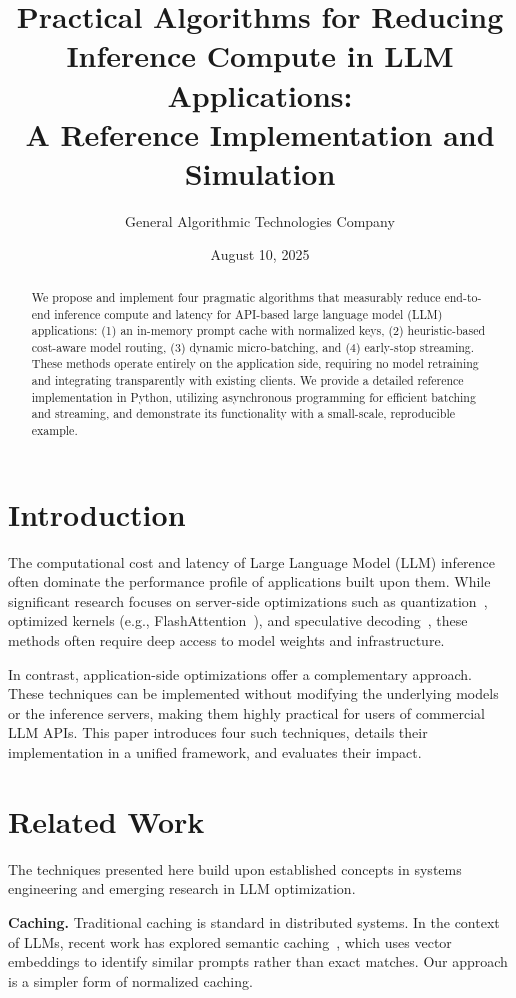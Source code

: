 \documentclass[11pt]{article}
\title{Practical Algorithms for Reducing Inference Compute in LLM Applications: \\ A Reference Implementation and Simulation}
\author{General Algorithmic Technologies Company}
\date{August 10, 2025}
\begin{document}
\maketitle

\begin{abstract}
We propose and implement four pragmatic algorithms that measurably reduce end-to-end inference compute and latency for API-based large language model (LLM) applications: (1) an in-memory prompt cache with normalized keys, (2) heuristic-based cost-aware model routing, (3) dynamic micro-batching, and (4) early-stop streaming. These methods operate entirely on the application side, requiring no model retraining and integrating transparently with existing clients. We provide a detailed reference implementation in Python, utilizing asynchronous programming for efficient batching and streaming, and demonstrate its functionality with a small-scale, reproducible example.
\end{abstract}

\section{Introduction}
The computational cost and latency of Large Language Model (LLM) inference often dominate the performance profile of applications built upon them. While significant research focuses on server-side optimizations such as quantization~\cite{frantar2022gptq}, optimized kernels (e.g., FlashAttention~\cite{dao2022flashattention}), and speculative decoding~\cite{leviathan2023fast}, these methods often require deep access to model weights and infrastructure.

In contrast, application-side optimizations offer a complementary approach. These techniques can be implemented without modifying the underlying models or the inference servers, making them highly practical for users of commercial LLM APIs. This paper introduces four such techniques, details their implementation in a unified framework, and evaluates their impact.

\section{Related Work}
The techniques presented here build upon established concepts in systems engineering and emerging research in LLM optimization.

\noindent\textbf{Caching.} Traditional caching is standard in distributed systems. In the context of LLMs, recent work has explored semantic caching~\cite{sharma2023caching}, which uses vector embeddings to identify similar prompts rather than exact matches. Our approach is a simpler form of normalized caching.
\end{document}
